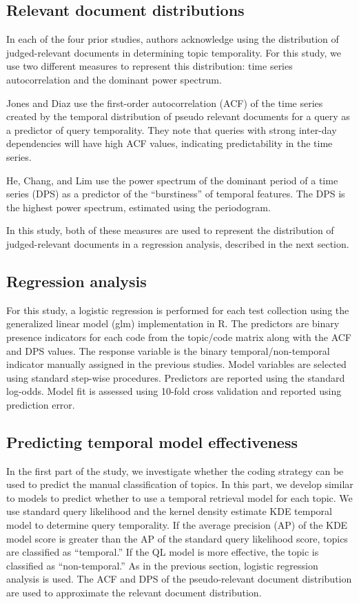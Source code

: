 \documentclass{sig-alternate}
\begin{document}
\subsection{Relevant document distributions}

In each of the four prior studies, authors acknowledge using the distribution of judged-relevant documents in determining topic temporality. For this study, we use two different measures to represent this distribution: time series autocorrelation and the dominant power spectrum.

Jones and Diaz \cite{Jones2007} use the first-order autocorrelation (ACF) of the time series created by the temporal distribution of pseudo relevant documents for a query as a predictor of query temporality. They note that queries with strong inter-day dependencies will have high ACF values, indicating predictability in the time series.

He, Chang, and Lim \cite{He2007} use the power spectrum of the dominant period of a time series (DPS) as a predictor of the ``burstiness'' of temporal features. The DPS is the highest power spectrum, estimated using the periodogram. 

In this study, both of these measures are used to represent the distribution of judged-relevant documents in a regression analysis, described in the next section.

\subsection{Regression analysis}

For this study, a logistic regression is performed for each test collection using the generalized linear model (glm) implementation in R. The predictors are binary presence indicators for each code from the topic/code matrix along with the ACF and DPS values. The response variable is the binary temporal/non-temporal indicator manually assigned in the previous studies. Model variables are selected using standard step-wise procedures. Predictors are reported using the standard log-odds. Model fit is assessed using 10-fold cross validation and reported using prediction error.

\subsection{Predicting temporal model effectiveness}
In the first part of the study, we investigate whether the coding strategy can be used to predict the manual classification of topics.  In this part, we develop similar to models to predict whether to use a temporal retrieval model for each topic. We use standard query likelihood \cite{XXX} and the kernel density estimate {KDE} temporal model \cite{Efron2014} to determine query temporality. If the average precision (AP) of the KDE model score is greater than the AP of the standard query likelihood score, topics are classified as ``temporal.''  If the QL model is more effective, the topic is classified as ``non-temporal.'' As in the previous section, logistic regression analysis is used.  The ACF and DPS of the pseudo-relevant document distribution are used to approximate the relevant document distribution.
\end{document}
